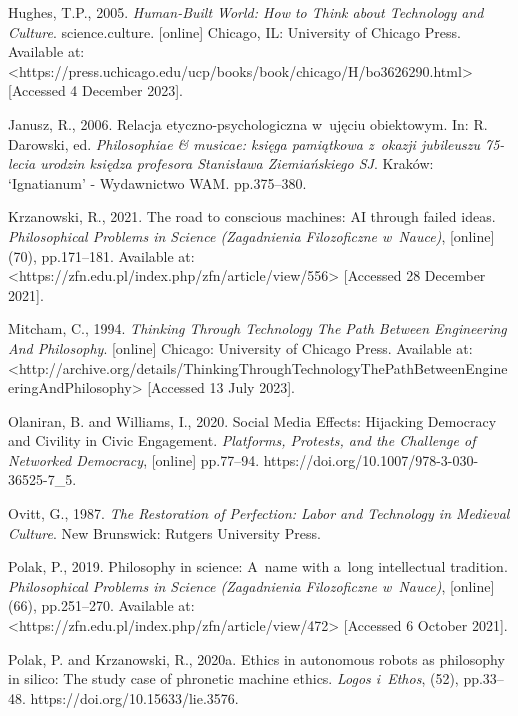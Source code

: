 Hughes, T.P., 2005. \textit{Human-Built World: How to Think about Technology and Culture}. science.culture. [online] Chicago, IL: University of Chicago Press. Available at: {\textless}https://press.uchicago.edu/ucp/books/book/chicago/H/bo3626290.html{\textgreater} [Accessed 4 December 2023].



Janusz, R., 2006. Relacja etyczno-psychologiczna w~ujęciu obiektowym. In: R. Darowski, ed. \textit{Philosophiae \& musicae: księga pamiątkowa z~okazji jubileuszu 75-lecia urodzin księdza profesora Stanisława Ziemiańskiego SJ}. Kraków: ‘Ignatianum' - Wydawnictwo WAM. pp.375–380.



Krzanowski, R., 2021. The road to conscious machines: AI through failed ideas. \textit{Philosophical Problems in Science (Zagadnienia Filozoficzne w~Nauce)}, [online] (70), pp.171–181. Available at: {\textless}https://zfn.edu.pl/index.php/zfn/article/view/556{\textgreater} [Accessed 28 December 2021].



Mitcham, C., 1994. \textit{Thinking Through Technology The Path Between Engineering And Philosophy}. [online] Chicago: University of Chicago Press. Available at: {\textless}http://archive.org/details/ThinkingThroughTechnologyThePathBetweenEngineeringAndPhilosophy{\textgreater} [Accessed 13 July 2023].



Olaniran, B. and Williams, I., 2020. Social Media Effects: Hijacking Democracy and Civility in Civic Engagement. \textit{Platforms, Protests, and the Challenge of Networked Democracy}, [online] pp.77–94. https://doi.org/10.1007/978-3-030-36525-7\_5.



Ovitt, G., 1987. \textit{The Restoration of Perfection: Labor and Technology in Medieval Culture}. New Brunswick: Rutgers University Press.



Polak, P., 2019. Philosophy in science: A~name with a~long intellectual tradition. \textit{Philosophical Problems in Science (Zagadnienia Filozoficzne w~Nauce)}, [online] (66), pp.251–270. Available at: {\textless}https://zfn.edu.pl/index.php/zfn/article/view/472{\textgreater} [Accessed 6 October 2021].



Polak, P. and Krzanowski, R., 2020a. Ethics in autonomous robots as philosophy in silico: The study case of phronetic machine ethics. \textit{Logos i~Ethos}, (52), pp.33–48. https://doi.org/10.15633/lie.3576.



